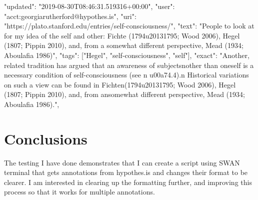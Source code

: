 \documentclass{article}
\begin{document}
\newline
"updated": "2019-08-30T08:46:31.519316+00:00", 
\newline
"user": "acct:georgiarutherford@hypothes.is", 
\newline
"uri": "https://plato.stanford.edu/entries/self-consciousness/", 
\newline
"text": "People to look at for my idea of the self and other: Fichte (1794u20131795; Wood 2006), Hegel (1807; Pippin 2010), and, from a somewhat different perspective, Mead (1934; Aboulafia 1986)", 
\newline
"tags": ["Hegel", "self-consciousness", "self"], 
\newline
"exact": "Another, related tradition has argued that an awareness of subjectsnother than oneself is a necessary condition of self-consciousness (see n u00a74.4).n Historical variations on such a view can be found in Fichten(1794u20131795; Wood 2006), Hegel (1807; Pippin 2010), and, from ansomewhat different perspective, Mead (1934; Aboulafia 1986).", 

\section{Conclusions}
The testing I have done demonstrates that I can create a script using SWAN terminal that gets annotations from hypothes.is and changes their format to be clearer. I am interested in clearing up the formatting further, and improving this process so that it works for multiple annotations. 
\end{document}
